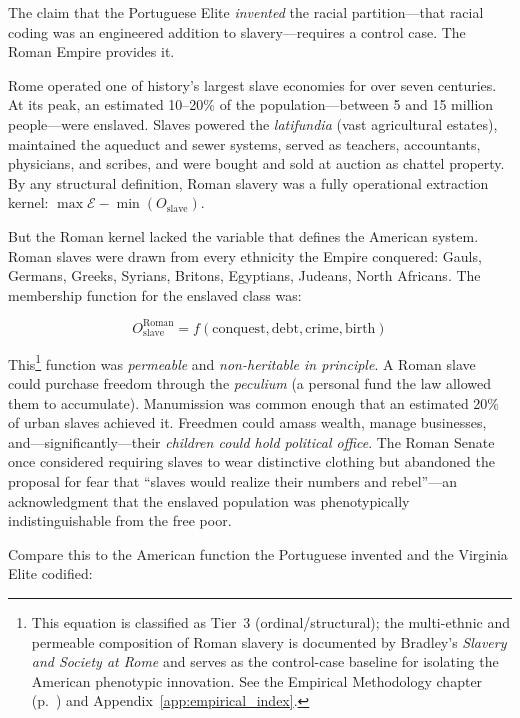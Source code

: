 The claim that the Portuguese Elite \textit{invented} the racial partition---that racial coding was an engineered addition to slavery---requires a control case. The Roman Empire provides it.

Rome operated one of history's largest slave economies for over seven centuries. At its peak, an estimated 10--20\% of the population---between 5 and 15 million people---were enslaved. Slaves powered the \textit{latifundia} (vast agricultural estates), maintained the aqueduct and sewer systems, served as teachers, accountants, physicians, and scribes, and were bought and sold at auction as chattel property. By any structural definition, Roman slavery was a fully operational extraction kernel: $\max \mathcal{E} - \min(O_{\text{slave}})$.

But the Roman kernel lacked the variable that defines the American system. Roman slaves were drawn from every ethnicity the Empire conquered: Gauls, Germans, Greeks, Syrians, Britons, Egyptians, Judeans, North Africans. The membership function for the enslaved class was:

\begin{equation}\label{eq:2.4-roman-membership-function}
O_{\text{slave}}^{\text{Roman}} = f(\text{conquest}, \text{debt}, \text{crime}, \text{birth})
\end{equation}

This\footnote{This equation is classified as Tier~3 (ordinal/structural); the multi-ethnic and permeable composition of Roman slavery is documented by Bradley's \textit{Slavery and Society at Rome} \cite{bradley_slavery_rome} and serves as the control-case baseline for isolating the American phenotypic innovation. See the Empirical Methodology chapter (p.~\pageref{ch:empirical_methodology}) and Appendix~\ref{app:empirical_index}.} function was \textit{permeable} and \textit{non-heritable in principle}. A Roman slave could purchase freedom through the \textit{peculium} (a personal fund the law allowed them to accumulate). Manumission was common enough that an estimated 20\% of urban slaves achieved it. Freedmen could amass wealth, manage businesses, and---significantly---their \textit{children could hold political office}. The Roman Senate once considered requiring slaves to wear distinctive clothing but abandoned the proposal for fear that ``slaves would realize their numbers and rebel''---an acknowledgment that the enslaved population was phenotypically indistinguishable from the free poor.

Compare this to the American function the Portuguese invented and the Virginia Elite codified:

